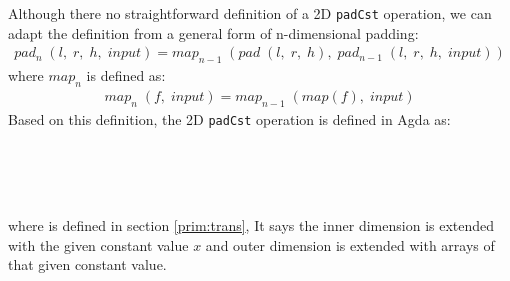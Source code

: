 \documentclass{l4proj}
\begin{document}
Although there no straightforward definition of a 2D \texttt{padCst} operation, we can adapt the definition from a general form of n-dimensional padding:
\begin{align}
    \label{lift:padnd}
    pad_n\; (l,\; r,\; h,\; input) = map_{n-1}\; (pad\; (l,\; r,\; h),\; pad_{n-1}\; (l,\; r,\; h,\; input))
\end{align}
where $map_n$ is defined as:
\begin{align}
    \label{lift:mapnd}
    map_n\; (f,\; input) = map_{n-1}\; (map(f),\; input)
\end{align}
Based on this definition, the 2D \texttt{padCst} operation is defined in Agda as:
\begin{code}%
\>[0]\<%
\\
\>[0]\AgdaSpace{}%
\AgdaSymbol{:}%
\>[1131I]\AgdaSymbol{\{}\AgdaSpace{}%
\AgdaSpace{}%
\AgdaSymbol{:}\AgdaSpace{}%
\AgdaSymbol{\}}\AgdaSpace{}%
\AgdaSpace{}%
\AgdaSymbol{(}\AgdaSpace{}%
\AgdaSpace{}%
\AgdaSymbol{:}\AgdaSpace{}%
\AgdaSymbol{)}\AgdaSpace{}%
\AgdaSpace{}%
\AgdaSymbol{\{}\AgdaSpace{}%
\AgdaSymbol{:}\AgdaSpace{}%
\AgdaSymbol{\}}\AgdaSpace{}%
\AgdaSpace{}%
\AgdaSpace{}%
\AgdaSpace{}%
\AgdaSpace{}%
\AgdaSymbol{(}\AgdaSpace{}%
\AgdaSpace{}%
\AgdaSymbol{)}\AgdaSpace{}%
\AgdaSpace{}%
\<%
\\
\>[.][@{}l@{}]\<[1131I]%
\>[10]\AgdaSpace{}%
\AgdaSymbol{(}\AgdaSpace{}%
\AgdaSpace{}%
\AgdaSymbol{(}\AgdaSpace{}%
\AgdaOperator{\AgdaPrimitive{+}}\AgdaSpace{}%
\AgdaSpace{}%
\AgdaOperator{\AgdaPrimitive{+}}\AgdaSpace{}%
\AgdaSymbol{))}\AgdaSpace{}%
\AgdaSymbol{(}\AgdaSpace{}%
\AgdaOperator{\AgdaPrimitive{+}}\AgdaSpace{}%
\AgdaSpace{}%
\AgdaOperator{\AgdaPrimitive{+}}\AgdaSpace{}%
\AgdaSymbol{)}\<%
\\
\>[0]\AgdaSpace{}%
\AgdaSymbol{\{}\AgdaSymbol{\}}\AgdaSpace{}%
\AgdaSpace{}%
\AgdaSpace{}%
\AgdaSpace{}%
\AgdaSpace{}%
\AgdaSymbol{=}\AgdaSpace{}%
\AgdaSpace{}%
\AgdaSymbol{(}\AgdaSpace{}%
\AgdaSpace{}%
\AgdaSpace{}%
\AgdaSymbol{)}\AgdaSpace{}%
\AgdaSymbol{(}\AgdaSpace{}%
\AgdaSpace{}%
\AgdaSpace{}%
\AgdaSymbol{(}\AgdaSpace{}%
\AgdaSpace{}%
\AgdaSymbol{)}\AgdaSpace{}%
\AgdaSymbol{)}\<%
\end{code}
where  is defined in section \ref{prim:trans}, It says the inner dimension is extended with the given constant value $x$ and outer dimension is extended with arrays of that given constant value.
\end{document}
